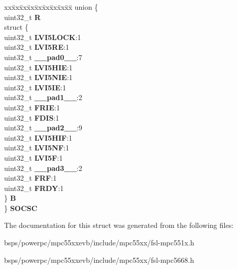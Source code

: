 \begin{DoxyCompactItemize}
\begin{tabbing}
\end{tabbing}\item 
\mbox{\label{structCRP__tag_ac720e3088a0f14318144f30af00dd9b9}} 
\begin{tabbing}
xx\=xx\=xx\=xx\=xx\=xx\=xx\=xx\=xx\=\kill
union \{\\
\>uint32\_t {\bfseries R}\\
\>struct \{\\
\>\>uint32\_t {\bfseries LVI5LOCK}:1\\
\>\>uint32\_t {\bfseries LVI5RE}:1\\
\>\>uint32\_t {\bfseries \_\_pad0\_\_}:7\\
\>\>uint32\_t {\bfseries LVI5HIE}:1\\
\>\>uint32\_t {\bfseries LVI5NIE}:1\\
\>\>uint32\_t {\bfseries LVI5IE}:1\\
\>\>uint32\_t {\bfseries \_\_pad1\_\_}:2\\
\>\>uint32\_t {\bfseries FRIE}:1\\
\>\>uint32\_t {\bfseries FDIS}:1\\
\>\>uint32\_t {\bfseries \_\_pad2\_\_}:9\\
\>\>uint32\_t {\bfseries LVI5HIF}:1\\
\>\>uint32\_t {\bfseries LVI5NF}:1\\
\>\>uint32\_t {\bfseries LVI5F}:1\\
\>\>uint32\_t {\bfseries \_\_pad3\_\_}:2\\
\>\>uint32\_t {\bfseries FRF}:1\\
\>\>uint32\_t {\bfseries FRDY}:1\\
\>\} {\bfseries B}\\
\} {\bfseries SOCSC}\\

\end{tabbing}\end{DoxyCompactItemize}


The documentation for this struct was generated from the following files\+:\begin{DoxyCompactItemize}
\item 
bsps/powerpc/mpc55xxevb/include/mpc55xx/fsl-\/mpc551x.\+h\item 
bsps/powerpc/mpc55xxevb/include/mpc55xx/fsl-\/mpc5668.\+h\end{DoxyCompactItemize}
